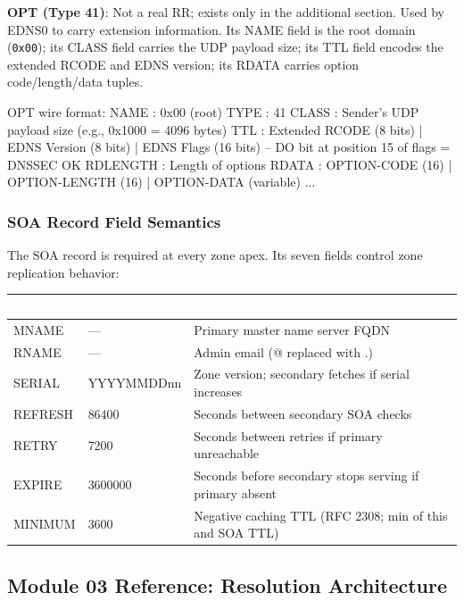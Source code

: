 \documentclass[11pt,letterpaper]{article}
\newcommand{\tableheader}[1]{\textbf{\sffamily\textcolor{white}{#1}}}
\begin{document}
\textbf{OPT (Type 41)}: Not a real RR; exists only in the additional section. Used by EDNS0 to carry extension information. Its NAME field is the root domain (\texttt{0x00}); its CLASS field carries the UDP payload size; its TTL field encodes the extended RCODE and EDNS version; its RDATA carries option code/length/data tuples.

\begin{asciibox}
OPT wire format:
NAME      : 0x00 (root)
TYPE      : 41
CLASS     : Sender's UDP payload size (e.g., 0x1000 = 4096 bytes)
TTL       : Extended RCODE (8 bits) | EDNS Version (8 bits) | EDNS Flags (16 bits)
            -- DO bit at position 15 of flags = DNSSEC OK
RDLENGTH  : Length of options
RDATA     : {OPTION-CODE (16) | OPTION-LENGTH (16) | OPTION-DATA (variable)} ...
\end{asciibox}

\subsubsection{SOA Record Field Semantics}

The SOA record is required at every zone apex. Its seven fields control zone replication behavior:

\begin{center}
\begin{tabularx}{\textwidth}{L{2.2cm}C{2cm}X}
\toprule
{}
\tableheader{Field} & \tableheader{Recommended} & \tableheader{Semantics} \\
\midrule
MNAME & --- & Primary master name server FQDN \\
RNAME & --- & Admin email (@ replaced with .) \\
SERIAL & YYYYMMDDnn & Zone version; secondary fetches if serial increases \\
REFRESH & 86400 & Seconds between secondary SOA checks \\
RETRY & 7200 & Seconds between retries if primary unreachable \\
EXPIRE & 3600000 & Seconds before secondary stops serving if primary absent \\
MINIMUM & 3600 & Negative caching TTL (RFC 2308; min of this and SOA TTL) \\
\bottomrule
\end{tabularx}
\end{center}

\subsection{Module 03 Reference: Resolution Architecture}
\end{document}
